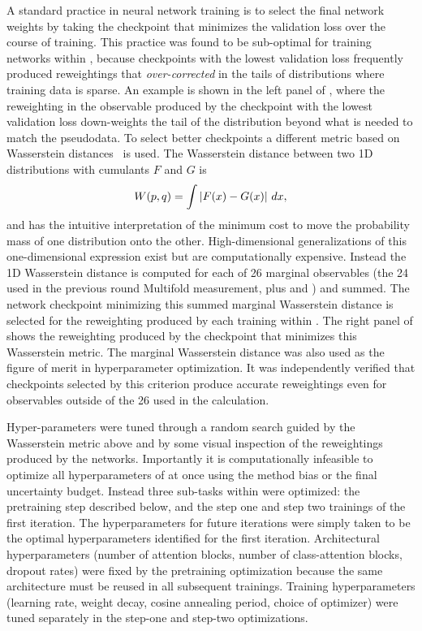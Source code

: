 A standard practice in neural network training is to select the final network weights by taking the checkpoint that minimizes the validation loss over the course of training.
This practice was found to be sub-optimal for training networks within \Omnifold, because checkpoints with the lowest validation loss frequently produced reweightings that \textit{over-corrected} in the tails of distributions where training data is sparse.
An example is shown in the left panel of , where the reweighting in the \HT observable produced by the checkpoint with the lowest validation loss down-weights the tail of the distribution beyond what is needed to match the pseudodata.
To select better checkpoints a different metric based on Wasserstein distances~\cite{panaretos2019statistical} is used.
The Wasserstein distance between two 1D distributions with cumulants $F$ and $G$ is
\begin{equation}
    W(p, q) = \int \left|F(x) - G(x)\right| \, dx,
\end{equation}
and has the intuitive interpretation of the minimum cost to move the probability mass of one distribution onto the other.
High-dimensional generalizations of this one-dimensional expression exist but are computationally expensive.
Instead the 1D Wasserstein distance is computed for each of 26 marginal observables (the 24 used in the previous round Multifold measurement, plus \nch and \HT) and summed.
The network checkpoint minimizing this summed marginal Wasserstein distance is selected for the reweighting produced by each training within \Omnifold.
The right panel of  shows the \HT reweighting produced by the checkpoint that minimizes this Wasserstein metric.
The marginal Wasserstein distance was also used as the figure of merit in hyperparameter optimization.
It was independently verified that checkpoints selected by this criterion produce accurate reweightings even for observables outside of the 26 used in the calculation.

Hyper-parameters were tuned through a random search guided by the Wasserstein metric above and by some visual inspection of the reweightings produced by the networks.
Importantly it is computationally infeasible to optimize all hyperparameters of \Omnifold at once using the method bias or the final uncertainty budget.
Instead three sub-tasks within \Omnifold were optimized: the pretraining step described below, and the step one and step two trainings of the first iteration.
The hyperparameters for future iterations were simply taken to be the optimal hyperparameters identified for the first iteration.
Architectural hyperparameters (number of attention blocks, number of class-attention blocks, dropout rates) were fixed by the pretraining optimization because the same architecture must be reused in all subsequent trainings.
Training hyperparameters (learning rate, weight decay, cosine annealing period, choice of optimizer) were tuned separately in the step-one and step-two optimizations.

